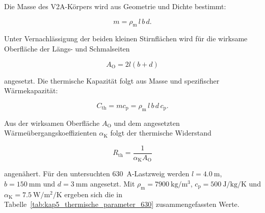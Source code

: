 Die Masse des V2A-Körpers wird aus Geometrie und Dichte bestimmt:

\begin{equation}
    m
    =
    \rho_\mathrm{m}\,l\,b\,d.
    \label{eq:kap5_masse_v2a}
\end{equation}

Unter Vernachlässigung der beiden kleinen Stirnflächen wird für die wirksame
Oberfläche der Längs- und Schmalseiten

\begin{equation}
    A_\mathrm{O}
    =
    2l(b+d)
    \label{eq:kap5_oberflaeche_v2a}
\end{equation}

angesetzt. Die thermische Kapazität folgt aus Masse und spezifischer
Wärmekapazität:

\begin{equation}
    C_\mathrm{th}
    =
    m c_\mathrm{p}
    =
    \rho_\mathrm{m}\,l\,b\,d\,c_\mathrm{p}.
    \label{eq:kap5_cth}
\end{equation}

Aus der wirksamen Oberfläche \(A_\mathrm{O}\) und dem angesetzten
Wärmeübergangskoeffizienten \(\alpha_\mathrm{K}\) folgt der thermische
Widerstand

\begin{equation}
    R_\mathrm{th}
    =
    \frac{1}{\alpha_\mathrm{K}A_\mathrm{O}}
    \label{eq:kap5_rth}
\end{equation}

angenähert. Für den untersuchten \SI{630}{\ampere}-Lastzweig werden
\(l=\SI{4.0}{\metre}\), \(b=\SI{150}{\milli\metre}\) und
\(d=\SI{3}{\milli\metre}\) angesetzt. Mit
\(\rho_\mathrm{m}=\SI{7900}{\kilogram\per\cubic\metre}\),
\(c_\mathrm{p}=\SI{500}{\joule\per\kilogram\per\kelvin}\) und
\(\alpha_\mathrm{K}=\SI{7.5}{\watt\per\square\metre\per\kelvin}\)
ergeben sich die in Tabelle~\ref{tab:kap5_thermische_parameter_630}
zusammengefassten Werte.


